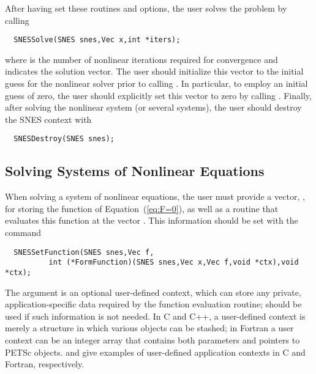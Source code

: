 After having set these routines and options, the user
solves the problem by calling 
\begin{verbatim}
  SNESSolve(SNES snes,Vec x,int *iters);
\end{verbatim}
where  is the number of nonlinear iterations required for
convergence and  indicates the solution vector. The user should
initialize this vector to the initial guess for the nonlinear solver
prior to calling .  In particular, to employ an
initial guess of zero, the user should explicitly set this vector to
zero by calling .  Finally, after solving the nonlinear
system (or several systems), the user should destroy the SNES context
with
\begin{verbatim}
  SNESDestroy(SNES snes);
\end{verbatim}

\subsection{Solving Systems of Nonlinear Equations}
\label{sec:sneseq}

When solving a system of nonlinear equations, the user must provide
a vector, , for storing the function of
Equation~(\ref{eq:F=0}), as well as a routine that evaluates this
function at the vector .  This information should be set with
the command 
\begin{verbatim}
  SNESSetFunction(SNES snes,Vec f,
          int (*FormFunction)(SNES snes,Vec x,Vec f,void *ctx),void *ctx);
\end{verbatim}
The argument  is an optional user-defined context, which can
store any private, application-specific data required by the
function evaluation routine;  should be used if such information
is not needed.  In C and C++, a user-defined context is merely a
structure in which various objects can be stashed; in Fortran a user
context can be an integer array that contains both parameters and
pointers to PETSc objects.  and
 give examples of user-defined
application contexts in C and Fortran, respectively.

